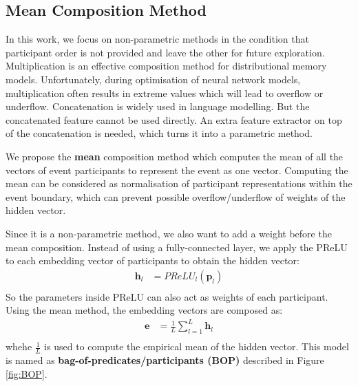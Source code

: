 \documentclass[a4paper]{article}
\begin{document}
\subsection{Mean Composition Method} \label{sec:mean-composition}
In this work, we focus on non-parametric methods in the condition that participant order is not provided and leave the other for future exploration. Multiplication is an effective composition method for distributional memory models. Unfortunately, during optimisation of neural network models, multiplication often results in extreme values which will lead to overflow or underflow. Concatenation is widely used in language modelling. But the concatenated feature cannot be used directly. An extra feature extractor on top of the concatenation is needed, which turns it into a parametric method. 
% 
% 
% 
%
% 
%


We propose the \textbf{mean} composition method which computes the mean of all the vectors of event participants to represent the event as one vector. Computing the mean can be considered as normalisation of participant representations within the event boundary, which can prevent possible overflow/underflow of weights of the hidden vector. 

Since it is a non-parametric method, we also want to add a weight before the mean composition. Instead of using a fully-connected layer, we apply the PReLU to each embedding vector of participants to obtain the hidden vector: 
\begin{equation} \label{eq:nonlinearity-bop}
\begin{aligned}
    \mathbf{h}_l
        &= PReLU_l(\mathbf{p}_l) \\
\end{aligned}
\end{equation}
So the parameters inside PReLU can also act as weights of each participant. Using the mean method, the embedding vectors are composed as:
\begin{equation} \label{eq:mean-comp-bop}
\begin{aligned}
    \mathbf{e}
        &= \frac{1}{L} \sum_{l=1}^{L} \mathbf{h}_{l} \\
\end{aligned}
\end{equation}
whehe $\frac{1}{L}$ is used to compute the empirical mean of the hidden vector. This model is named as \textbf{bag-of-predicates/participants (BOP)} described in Figure \ref{fig:BOP}. 
\end{document}

